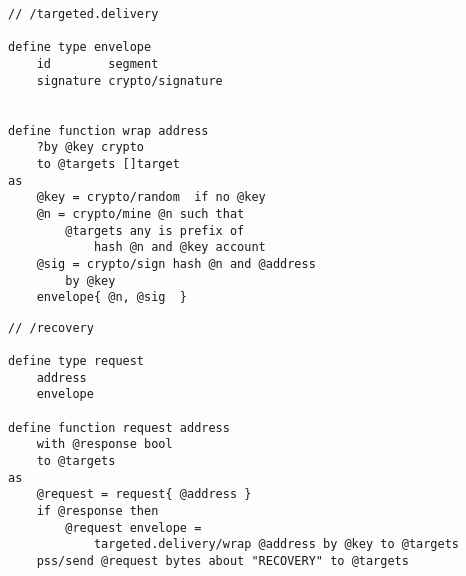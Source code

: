 
\begin{definition}\label{def:targeted-delivery}
\begin{lstlisting}[language=buzz1]
// /targeted.delivery

define type envelope
    id        segment
    signature crypto/signature


define function wrap address
    ?by @key crypto
    to @targets []target
as
    @key = crypto/random  if no @key
    @n = crypto/mine @n such that
        @targets any is prefix of
            hash @n and @key account
    @sig = crypto/sign hash @n and @address 
        by @key 
    envelope{ @n, @sig  }            

\end{lstlisting}
\end{definition}

\begin{definition}\label{def:recovery-request}
\begin{lstlisting}[language=buzz1]
// /recovery

define type request
    address
    envelope
    
define function request address
    with @response bool
    to @targets 
as  
    @request = request{ @address }
    if @response then
        @request envelope =
            targeted.delivery/wrap @address by @key to @targets
    pss/send @request bytes about "RECOVERY" to @targets
    
    

\end{lstlisting}
\end{definition}

\begin{definition}\label{def:recovery}
\begin{lstlisting}[language=buzz1]


    

\end{lstlisting}
\end{definition}